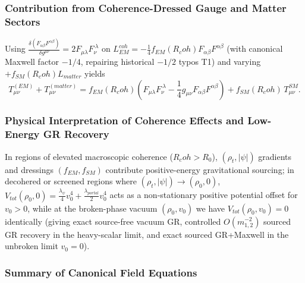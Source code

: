 \documentclass[american,11pt,letterpaper]{article}
\newcommand{\Rcoh}{R_{\mathrm{coh}}}
\def\mathcal#1{#1}%
\def\mathrm#1{#1}%
\def\texttt#1{#1}%
\def\Rcoh{R_coh}%
\begin{document}
\subsubsection{Contribution from Coherence-Dressed Gauge and Matter Sectors}

Using $\frac{\delta(F_{\alpha\beta}F^{\alpha\beta})}{\delta g^{\mu\nu}} = 2 F_{\mu\lambda}F_\nu^{\ \lambda}$ on $\mathcal{L}_{\mathrm{EM}}^{\mathrm{coh}} = -\frac{1}{4}f_{\mathrm{EM}}(\Rcoh)F_{\alpha\beta}F^{\alpha\beta}$ (with canonical Maxwell factor $-1/4$, repairing historical $-1/2$ typos \texttt{T1}) and varying $+f_{\mathrm{SM}}(\Rcoh)\mathcal{L}_{\mathrm{matter}}$ yields
\begin{equation}
T_{\mu\nu}^{(\mathrm{EM})} + T_{\mu\nu}^{(\mathrm{matter})}
= f_{\mathrm{EM}}(\Rcoh)\left(F_{\mu\lambda}F_\nu^{\ \lambda} - \frac{1}{4}g_{\mu\nu}F_{\alpha\beta}F^{\alpha\beta}\right)
  + f_{\mathrm{SM}}(\Rcoh)\,T_{\mu\nu}^{\mathrm{SM}}.
\label{eq:T_dressed_combined_sec8}
\end{equation}

\subsubsection{Physical Interpretation of Coherence Effects and Low-Energy GR Recovery}

In regions of elevated macroscopic coherence ($\Rcoh > R_0$), $(\rho_t, |\psi|)$ gradients and dressings $(f_{\mathrm{EM}}, f_{\mathrm{SM}})$ contribute positive-energy gravitational sourcing; in decohered or screened regions where $(\rho_t, |\psi|) \to (\rho_0, 0)$, $V_{\mathrm{tot}}(\rho_0, 0) = \frac{\lambda_\psi}{4}v_0^4 + \frac{\lambda_{\mathrm{portal}}}{2}v_0^4$ acts as a non-stationary positive potential offset for $v_0 > 0$, while at the broken-phase vacuum $(\rho_0, v_0)$ we have $V_{\mathrm{tot}}(\rho_0, v_0) = 0$ identically (giving exact source-free vacuum GR, controlled $O(m_{1,2}^{-2})$ sourced GR recovery in the heavy-scalar limit, and exact sourced GR+Maxwell in the unbroken limit $v_0 = 0$).

\subsubsection{Summary of Canonical Field Equations}
\end{document}
